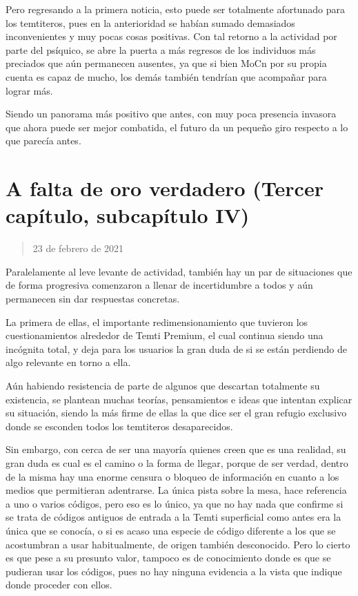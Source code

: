 \documentclass[
  spanish,
]{book}
\begin{document}
Pero regresando a la primera noticia, esto puede ser totalmente afortunado para los temtiteros, pues en la anterioridad se habían sumado demasiados inconvenientes y muy pocas cosas positivas. Con tal retorno a la actividad por parte del psíquico, se abre la puerta a más regresos de los individuos más preciados que aún permanecen ausentes, ya que si bien MoCn por su propia cuenta es capaz de mucho, los demás también tendrían que acompañar para lograr más.

Siendo un panorama más positivo que antes, con muy poca presencia invasora que ahora puede ser mejor combatida, el futuro da un pequeño giro respecto a lo que parecía antes.

\hypertarget{a-falta-de-oro-verdadero-tercer-capuxedtulo-subcapuxedtulo-iv}{%
\section{A falta de oro verdadero (Tercer capítulo, subcapítulo IV)}\label{a-falta-de-oro-verdadero-tercer-capuxedtulo-subcapuxedtulo-iv}}

\begin{quote}
23 de febrero de 2021
\end{quote}

Paralelamente al leve levante de actividad, también hay un par de situaciones que de forma progresiva comenzaron a llenar de incertidumbre a todos y aún permanecen sin dar respuestas concretas.

La primera de ellas, el importante redimensionamiento que tuvieron los cuestionamientos alrededor de Temti Premium, el cual continua siendo una incógnita total, y deja para los usuarios la gran duda de si se están perdiendo de algo relevante en torno a ella.

Aún habiendo resistencia de parte de algunos que descartan totalmente su existencia, se plantean muchas teorías, pensamientos e ideas que intentan explicar su situación, siendo la más firme de ellas la que dice ser el gran refugio exclusivo donde se esconden todos los temtiteros desaparecidos.

Sin embargo, con cerca de ser una mayoría quienes creen que es una realidad, su gran duda es cual es el camino o la forma de llegar, porque de ser verdad, dentro de la misma hay una enorme censura o bloqueo de información en cuanto a los medios que permitieran adentrarse. La única pista sobre la mesa, hace referencia a uno o varios códigos, pero eso es lo único, ya que no hay nada que confirme si se trata de códigos antiguos de entrada a la Temti superficial como antes era la única que se conocía, o si es acaso una especie de código diferente a los que se acostumbran a usar habitualmente, de origen también desconocido. Pero lo cierto es que pese a su presunto valor, tampoco es de conocimiento donde es que se pudieran usar los códigos, pues no hay ninguna evidencia a la vista que indique donde proceder con ellos.
\end{document}
